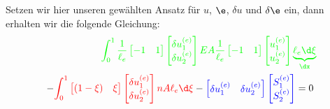 \documentclass[letterpaper,10pt,german]{jupyterBook}
\begin{document}
Setzen wir hier unseren gewählten Ansatz für \(u\), \(\e\), \(\delta u\) und \(\delta \e\) ein, dann erhalten wir die folgende Gleichung:
\begin{equation}\label{equation:chapters/chapter2/1dFEM:stabFEM1}
\begin{split}\begin{align}
 \textcolor{green}{\int_{0}^{1} \frac{1}{\ell_e} \begin{bmatrix} -1 & 1 \end{bmatrix} \begin{bmatrix} \delta u_1^{(e)} \\ \delta u_2^{(e)}\end{bmatrix}  EA \frac{1}{\ell_e} \begin{bmatrix} -1 & 1 \end{bmatrix} \begin{bmatrix} u_1^{(e)} \\ u_2^{(e)}\end{bmatrix}   \underbrace{\ell_e \d \xi}_{\dx}} \\
 - \textcolor{red}{\int_0^{1} \begin{bmatrix} (1-\xi) & \xi \end{bmatrix} \begin{bmatrix} \delta u_1^{(e)} \\ \delta u_2^{(e)}\end{bmatrix}  n A \ell_e \d \xi} - \textcolor{blue}{\begin{bmatrix} \delta u_1^{(e)} & \delta u_2^{(e)}\end{bmatrix} \begin{bmatrix} S_1^{(e)} \\ S_2^{(e)} \end{bmatrix}}  = 0\; 
\end{align}\end{split}
\end{equation}
\end{document}
